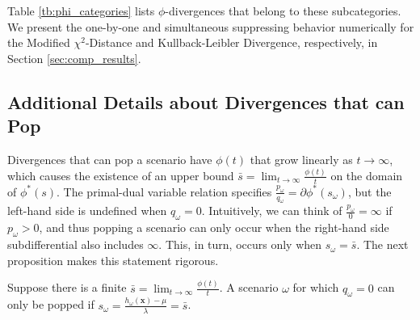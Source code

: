 \documentclass[ijoc,letterpaper]{informs3} %
\newcommand{\x}{\mathbf{x}}
\begin{document}
Table \ref{tb:phi_categories} lists $\phi$-divergences that belong to these subcategories. We present the one-by-one and simultaneous suppressing behavior numerically for the Modified $\chi^2$-Distance and Kullback-Leibler Divergence, respectively, in Section \ref{sec:comp_results}.

\subsection{Additional Details about Divergences that can Pop}
\label{ssec:pop}

Divergences that can pop a scenario have $\phi(t)$ that grow linearly as $t \rightarrow \infty$, which causes the existence of an upper bound $\bar{s} = \lim_{t \rightarrow \infty} \frac{\phi(t)}{t}$ on the domain of $\phi^*(s)$.
The primal-dual variable relation specifies $\frac{p_\omega}{q_\omega} = \partial \phi^*(s_\omega)$, but the left-hand side is undefined when $q_\omega = 0$.
Intuitively, we can think of $\frac{p_\omega}{0} = \infty$ if $p_\omega > 0$, and thus popping a scenario can only occur when the right-hand side subdifferential also includes $\infty$.
This, in turn, occurs only when $s_\omega = \bar{s}$.
The next proposition makes this statement rigorous.

\begin{proposition} \label{prop:pop}
	Suppose there is a finite $\bar{s} = \lim_{t \rightarrow \infty} \frac{\phi(t)}{t}$.
	A scenario $\omega$ for which $q_\omega = 0$ can only be popped if $s_\omega = \frac{h_\omega(\x) - \mu}{\lambda} = \bar{s}$.
\end{proposition}
\end{document}
